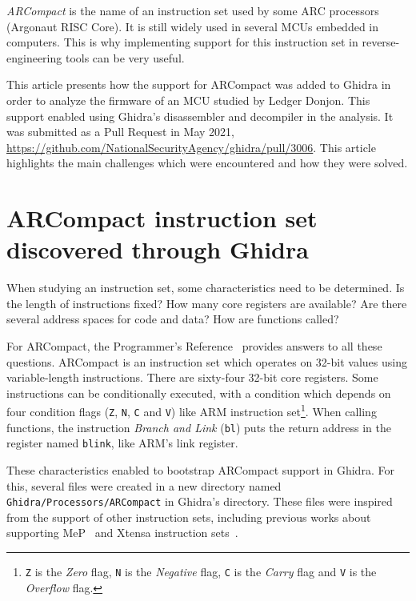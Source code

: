 \emph{ARCompact} is the name of an instruction set used by some ARC
processors (Argonaut RISC Core). It is still widely used in several MCUs
embedded in computers. This is why implementing support for this
instruction set in reverse-engineering tools can be very useful.

This article presents how the support for ARCompact was added to Ghidra
in order to analyze the firmware of an MCU studied by Ledger Donjon.
This support enabled using Ghidra's disassembler and decompiler in the
analysis. It was submitted as a Pull Request in May 2021,
\url{https://github.com/NationalSecurityAgency/ghidra/pull/3006}. This
article highlights the main challenges which were encountered and how
they were solved.

\section{ARCompact instruction set discovered through Ghidra}

When studying an instruction set, some characteristics need to be
determined. Is the length of instructions fixed? How many core registers
are available? Are there several address spaces for code and data? How
are functions called?

For ARCompact, the Programmer's
Reference~\cite{analyzingarcompactfirmwarewithghidra:arcompactisa}
provides answers to all these questions. ARCompact is an instruction set
which operates on 32-bit values using variable-length instructions.
There are sixty-four 32-bit core registers. Some instructions can be
conditionally executed, with a condition which depends on four condition
flags (\texttt{Z}, \texttt{N},
\texttt{C} and \texttt{V}) like ARM
instruction set\footnote{\texttt{Z} is the \emph{Zero}
  flag, \texttt{N} is the \emph{Negative} flag,
  \texttt{C} is the \emph{Carry} flag and
  \texttt{V} is the \emph{Overflow} flag.}. When
calling functions, the instruction \emph{Branch and Link}
(\texttt{bl}) puts the return address in the register
named \texttt{blink}, like ARM's link register.

These characteristics enabled to bootstrap ARCompact support in Ghidra.
For this, several files were created in a new directory named
\texttt{Ghidra/Processors/ARCompact} in Ghidra's
directory. These files were inspired from the support of other
instruction sets, including previous works about supporting
MeP~\cite{analyzingarcompactfirmwarewithghidra:beerump2019mep,analyzingarcompactfirmwarewithghidra:githubguedoumep,analyzingarcompactfirmwarewithghidra:githubxyzzmep}
and Xtensa instruction
sets~\cite{analyzingarcompactfirmwarewithghidra:githubyathxtensa,analyzingarcompactfirmwarewithghidra:githubprxtensa}.

